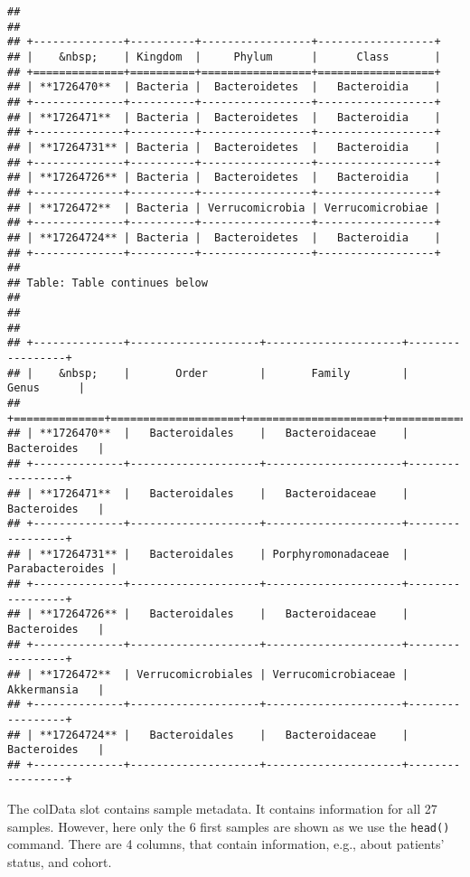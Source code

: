 \documentclass[
  oneside]{book}
\begin{document}
\begin{verbatim}
## 
## 
## +--------------+----------+-----------------+------------------+
## |    &nbsp;    | Kingdom  |     Phylum      |      Class       |
## +==============+==========+=================+==================+
## | **1726470**  | Bacteria |  Bacteroidetes  |   Bacteroidia    |
## +--------------+----------+-----------------+------------------+
## | **1726471**  | Bacteria |  Bacteroidetes  |   Bacteroidia    |
## +--------------+----------+-----------------+------------------+
## | **17264731** | Bacteria |  Bacteroidetes  |   Bacteroidia    |
## +--------------+----------+-----------------+------------------+
## | **17264726** | Bacteria |  Bacteroidetes  |   Bacteroidia    |
## +--------------+----------+-----------------+------------------+
## | **1726472**  | Bacteria | Verrucomicrobia | Verrucomicrobiae |
## +--------------+----------+-----------------+------------------+
## | **17264724** | Bacteria |  Bacteroidetes  |   Bacteroidia    |
## +--------------+----------+-----------------+------------------+
## 
## Table: Table continues below
## 
##  
## 
## +--------------+--------------------+---------------------+-----------------+
## |    &nbsp;    |       Order        |       Family        |      Genus      |
## +==============+====================+=====================+=================+
## | **1726470**  |   Bacteroidales    |   Bacteroidaceae    |   Bacteroides   |
## +--------------+--------------------+---------------------+-----------------+
## | **1726471**  |   Bacteroidales    |   Bacteroidaceae    |   Bacteroides   |
## +--------------+--------------------+---------------------+-----------------+
## | **17264731** |   Bacteroidales    | Porphyromonadaceae  | Parabacteroides |
## +--------------+--------------------+---------------------+-----------------+
## | **17264726** |   Bacteroidales    |   Bacteroidaceae    |   Bacteroides   |
## +--------------+--------------------+---------------------+-----------------+
## | **1726472**  | Verrucomicrobiales | Verrucomicrobiaceae |   Akkermansia   |
## +--------------+--------------------+---------------------+-----------------+
## | **17264724** |   Bacteroidales    |   Bacteroidaceae    |   Bacteroides   |
## +--------------+--------------------+---------------------+-----------------+
\end{verbatim}

The colData slot contains sample metadata. It contains information for all 27 samples.
However, here only the 6 first samples are shown as we use the \texttt{head()} command. There
are 4 columns, that contain information, e.g., about patients' status, and cohort.
\end{document}
